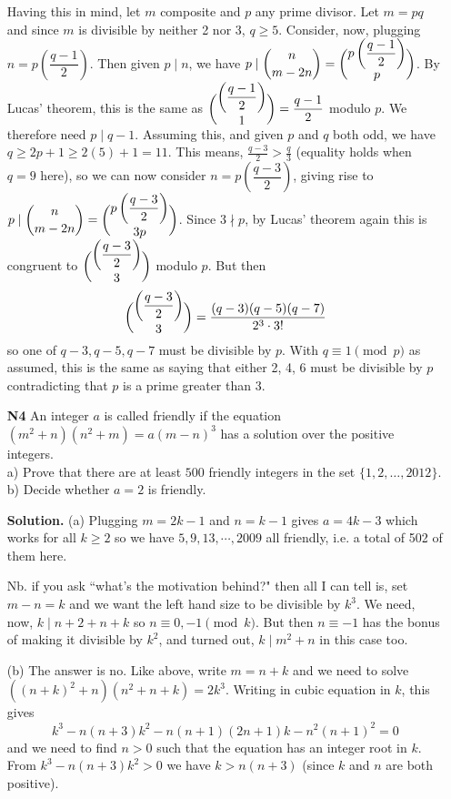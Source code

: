 \documentclass[11pt,a4paper]{article}
\begin{document}
\begin{enumerate}
	Having this in mind, let $m$ composite and $p$ any prime divisor. Let $m=pq$ and since $m$ is divisible by neither 2 nor 3, $q\ge 5$. Consider, now, plugging $n=p\left(\dfrac{q-1}{2}\right)$. Then given $p\mid n$, we have $p\mid \dbinom{n}{m-2n}=\dbinom{p\left(\dfrac{q-1}{2}\right)}{p}$. By Lucas' theorem, this is the same as $\dbinom{\left(\dfrac{q-1}{2}\right)}{1}=\dfrac{q-1}{2}$ modulo $p$. We therefore need $p\mid q-1$. 
	Assuming this, and given $p$ and $q$ both odd, we have $q\ge 2p+1\ge2(5)+1=11$. This means, $\frac{q-3}{2} > \frac{q}{3}$ (equality holds when $q=9$ here), so we can now consider $n=p\left(\dfrac{q-3}{2}\right)$, giving rise to $p\mid \dbinom{n}{m-2n}=\dbinom{p\left(\dfrac{q-3}{2}\right)}{3p}$. 
	Since $3\nmid p$, by Lucas' theorem again this is congruent to $\dbinom{\left(\dfrac{q-3}{2}\right)}{3}$ modulo $p$. But then 
	\[
	\dbinom{\left(\dfrac{q-3}{2}\right)}{3}
	=\frac{(q-3)(q-5)(q-7)}{2^3\cdot 3!}
	\]
	so one of $q-3, q-5, q-7$ must be divisible by $p$. 
	With $q\equiv 1\pmod{p}$ as assumed, this is the same as saying that either 2, 4, 6 must be divisible by $p$ contradicting that $p$ is a prime greater than 3. 
	
	\item[\textbf{N4}] An integer $a$ is called friendly if the equation $(m^2+n)(n^2+m)=a(m-n)^3$ has a solution over the positive integers.\\
	a) Prove that there are at least $500$ friendly integers in the set $\{ 1,2,\ldots ,2012\}$.\\
	b) Decide whether $a=2$ is friendly.
	
	\textbf{Solution.} (a) Plugging $m=2k-1$ and $n=k-1$ gives $a = 4k-3$ which works for all $k\ge 2$ so we have $5, 9, 13, \cdots , 2009$ all friendly, i.e. a total of 502 of them here. 
	
	Nb. if you ask ``what's the motivation behind?" then all I can tell is, set $m-n=k$ and we want the left hand size to be divisible by $k^3$. We need, now, $k\mid n+2+n+k$ so $n\equiv 0, -1\pmod{k}$. But then $n\equiv -1$ has the bonus of making it divisible by $k^2$, and turned out, $k\mid m^2+n$ in this case too. 
	
	(b) The answer is no. Like above, write $m=n+k$ and we need to solve $((n+k)^2+n)(n^2+n+k)=2k^3$. 
	Writing in cubic equation in $k$, this gives \[k^3-n(n+3)k^2-n(n+1)(2n+1)k-n^2(n+1)^2=0\]
	and we need to find $n>0$ such that the equation has an integer root in $k$. 
	From $k^3-n(n+3)k^2>0$ we have $k>n(n+3)$ (since $k$ and $n$ are both positive). 
	

\end{enumerate}
\end{document}

